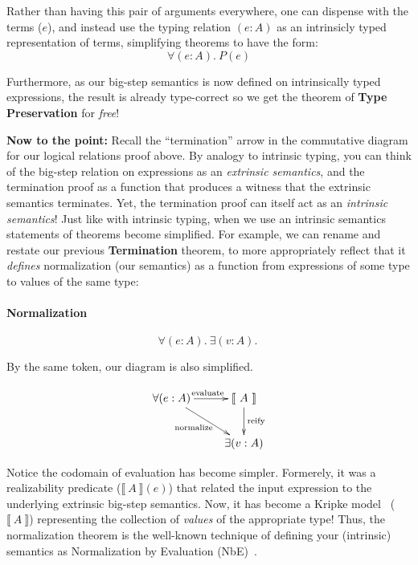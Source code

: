 \documentclass[preprint,nonatbib]{sigplanconf}
\numberwithin{mysubdfn}{mydfn}
\newcommand{\ascribe}[2]{(#1 : #2)}
\newcommand{\all}[1]{\forall#1.~}
\newcommand{\ex}[1]{\exists#1.~}
\newcommand{\el}[1]{\llbracket ~ #1 ~ \rrbracket}
\newcommand{\fun}[1]{\textmd{#1}}
\begin{document}
Rather than having this pair of arguments everywhere, one can dispense with
the terms ($e$), and instead use the typing relation $\ascribe{e}{A}$
as an intrinsicly typed representation of terms, simplifying theorems to
have the form:
$$
\all{\ascribe{e}{A}} P(e)
$$

Furthermore, as our big-step semantics is now defined on intrinsically
typed expressions, the result is already type-correct so we get the
theorem of {\bf Type Preservation} for {\it free}!

{\bf Now to the point:} 
Recall the ``termination'' arrow in the commutative diagram for our
logical relations proof above. By analogy to intrinsic typing, you
can think of the big-step relation on expressions as an
{\it extrinsic semantics}, and the termination proof as a function
that produces a witness that the extrinsic semantics terminates. Yet,
the termination proof can itself act as an {\it intrinsic semantics}! 
Just like with intrinsic typing, when we use an intrinsic semantics
statements of theorems become simplified. For example, we can rename
and restate our previous {\bf Termination} theorem, to more
appropriately reflect that it {\it defines} normalization (our
semantics) as a function from expressions of some type to values of
the same type:

\paragraph{Normalization}
$$
\all{\ascribe{e}{A}} \ex{\ascribe{v}{A}}
$$

By the same token, our diagram is also simplified.

\begin{displaymath}
    \xymatrix{
          {\forall (e : A)} 
          \ar[dr]_{\fun{normalize}}
          \ar[r]^{\fun{evaluate}}
        & {\el{A}}
          \ar[d]^{\large{\fun{reify}}}
\\      & \exists (v : A) }
\end{displaymath}

Notice the codomain of evaluation has become simpler. Formerely, it
was a realizability predicate ($\el{A}(e)$) that related the input
expression to the underlying extrinsic big-step semantics. Now, it has
become a Kripke model~\cite{TODO} ($\el{A}$) representing the
collection of {\it values} of the appropriate type! Thus, the normalization
theorem is the well-known technique of defining your (intrinsic)
semantics as Normalization by Evaluation (NbE)~\cite{TODO}.
\end{document}
